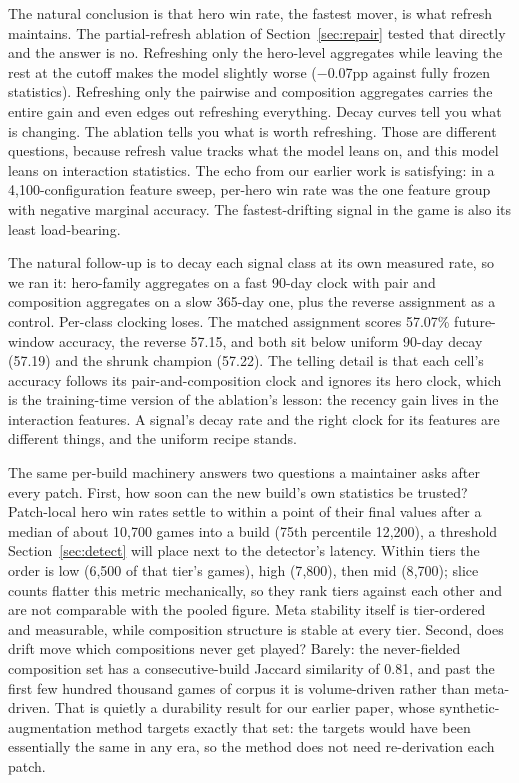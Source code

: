\documentclass[journal]{IEEEtran}
\begin{document}
The natural conclusion is that hero win rate, the fastest mover, is what
refresh maintains. The partial-refresh ablation of
Section~\ref{sec:repair} tested that directly and the answer is no.
Refreshing only the hero-level aggregates while leaving the rest at the
cutoff makes the model slightly worse ($-$0.07pp against fully frozen
statistics). Refreshing only the pairwise and composition aggregates
carries the entire gain and even edges out refreshing everything. Decay
curves tell you what is changing. The ablation tells you what is worth
refreshing. Those are different questions, because refresh value tracks
what the model leans on, and this model leans on interaction statistics.
The echo from our earlier work is satisfying: in a 4{,}100-configuration
feature sweep, per-hero win rate was the one feature group with negative
marginal accuracy. The fastest-drifting signal in the game is also its
least load-bearing.

The natural follow-up is to decay each signal class at its own measured
rate, so we ran it: hero-family aggregates on a fast 90-day clock with
pair and composition aggregates on a slow 365-day one, plus the reverse
assignment as a control. Per-class clocking loses. The matched
assignment scores 57.07\% future-window accuracy, the reverse 57.15, and
both sit below uniform 90-day decay (57.19) and the shrunk champion
(57.22). The telling detail is that each cell's accuracy follows its
pair-and-composition clock and ignores its hero clock, which is the
training-time version of the
ablation's lesson: the recency gain lives in the interaction features. A
signal's decay rate and the right clock for its features are different
things, and the uniform recipe stands.

The same per-build machinery answers two questions a maintainer asks
after every patch. First, how soon can the new build's own statistics be
trusted? Patch-local hero win rates settle to within a point of their
final values after a median of about 10{,}700 games into a build (75th
percentile 12{,}200), a threshold Section~\ref{sec:detect} will place
next to the detector's latency. Within tiers the order is low (6{,}500
of that tier's games), high (7{,}800), then mid (8{,}700); slice counts
flatter this metric mechanically, so they rank tiers against each other
and are not comparable with the pooled figure.
Meta stability itself is tier-ordered and measurable, while composition
structure is stable at every tier. Second, does drift move which
compositions never get played? Barely: the never-fielded composition set
has a consecutive-build Jaccard similarity of 0.81, and past the first
few hundred thousand games of corpus it is volume-driven rather than
meta-driven. That is quietly a durability result for our earlier paper,
whose synthetic-augmentation method targets exactly that set: the
targets would have been essentially the same in any era, so the method
does not need re-derivation each patch.
\end{document}
